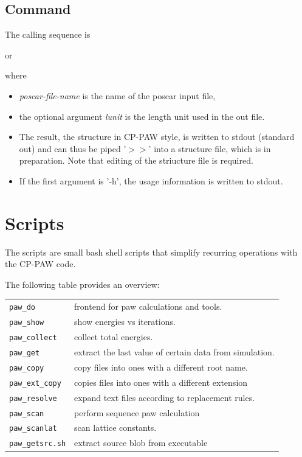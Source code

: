 \documentclass[final,12pt,makeidx,DIV=calc]{article}
\begin{document}
{{{{{{%
\subsection{Command}

The calling sequence is\bigskip

\bigskip

\noindent or\bigskip

\bigskip

\noindent
where 
\begin{itemize}
\item \textit{poscar-file-name} is the name of the poscar input file, 
\item the optional argument \textit{lunit} is the length unit used in
  the out file.
\item The result, the structure in CP-PAW style, is written to stdout
  (standard out) and can thus be piped '$>>$' into a structure file,
  which is in preparation. Note that editing of the striucture file is
  required.
\item If the first argument is '-h', the usage information is written
  to stdout.
\end{itemize}

\newpage
\section{Scripts}
The scripts are small bash shell scripts that simplify recurring operations
with the CP-PAW code. 

The following table provides an overview:\\
\begin{center}
\begin{tabular}{ll}
\verb|paw_do|      & frontend for paw calculations and tools. \\
\verb|paw_show|    & show energies vs iterations. \\
\verb|paw_collect| & collect total energies. \\
\verb|paw_get|     & extract the last value of certain data from simulation.\\
\verb|paw_copy|    & copy files into ones with a different root name.\\
\verb|paw_ext_copy|& copies files into ones with a different extension\\
\verb|paw_resolve| & expand text files according to replacement rules.\\
\verb|paw_scan|    & perform sequence paw calculation \\
\verb|paw_scanlat| & scan lattice constants. \\
\verb|paw_getsrc.sh| & extract source blob from executable\\
\end{tabular}
\end{center}

}}}}}}
\end{document}
